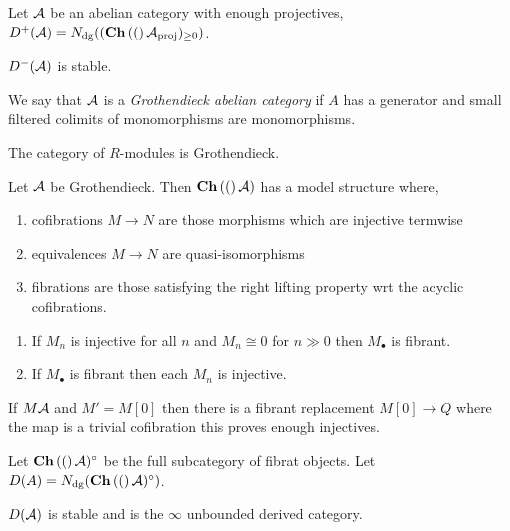 \documentclass[12pt]{article}
\begin{document}
\begin{defn}
Let $\mathcal{A}$ be an abelian category with enough projectives,
$D^+(\mathcal{A}) = N_{\mathrm{dg}}((\mathbf{Ch}\left( ( \right)\mathcal{A}_{\text{proj}})_{\ge 0})$.
\end{defn}

\begin{prop}[Prop 1.3.2.10]
$D^{-}(\mathcal{A})$ is stable. 
\end{prop}

\begin{defn}
We say that $\mathcal{A}$ is a \textit{Grothendieck abelian category} if $A$ has a generator and small filtered colimits of monomorphisms are monomorphisms.
\end{defn}

\begin{example}
The category of $R$-modules is Grothendieck.
\end{example}

\begin{theorem}
Let $\mathcal{A}$ be Grothendieck. Then $\mathbf{Ch}\left( ( \right)\mathcal{A})$ has a model structure where,
\begin{enumerate}
\item cofibrations $M \to N$ are those morphisms which are injective termwise
\item equivalences $M \to N$ are quasi-isomorphisms
\item fibrations are those satisfying the right lifting property wrt the acyclic cofibrations.
\end{enumerate}
\end{theorem}

\begin{prop}[1.3.5.6]
\begin{enumerate}
\item If $M_n$ is injective for all $n$ and $M_n \cong 0$ for $n \gg 0$ then $M_\bullet$ is fibrant.
\item If $M_\bullet$ is fibrant then each $M_n$ is injective. 
\end{enumerate}
\end{prop}

If $M \mathcal{A}$ and $M' = M[0]$ then there is a fibrant replacement $M[0] \to Q$ where the map is a trivial cofibration this proves enough injectives.

\begin{defn}
Let $\mathbf{Ch}\left( ( \right)\mathcal{A})^\circ$ be the full subcategory of fibrat objects. Let $D(A) = N_{\mathrm{dg}}(\mathbf{Ch}\left( ( \right)\mathcal{A})^\circ)$.
\end{defn}

\begin{prop}
$D(\mathcal{A})$ is stable and is the $\infty$ unbounded derived category. 
\end{prop}
\end{document}
